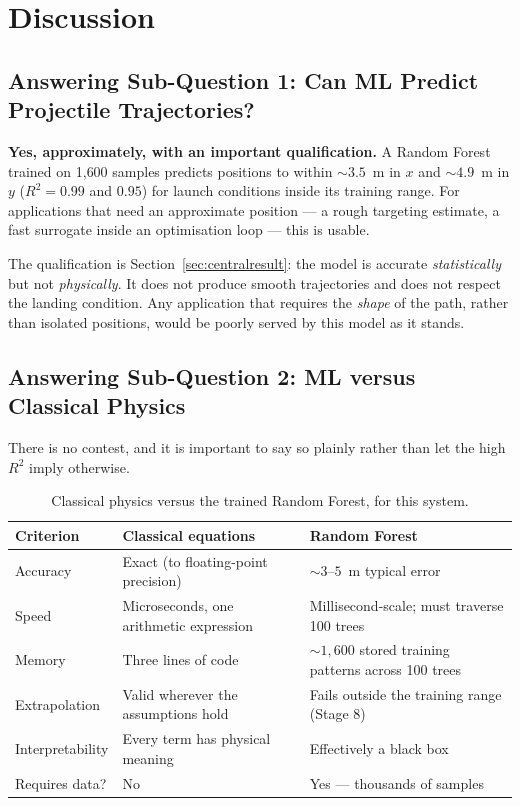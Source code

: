 \documentclass[11pt,a4paper]{article}
\newcommand{\Rsq}{R^{2}}
\begin{document}
\section{Discussion}\label{sec:discussion}

\subsection{Answering Sub-Question 1: Can ML Predict Projectile Trajectories?}

\textbf{Yes, approximately, with an important qualification.} A Random Forest trained on 1{,}600
samples predicts positions to within ${\sim}3.5$~m in $x$ and ${\sim}4.9$~m in $y$ ($\Rsq=0.99$ and
$0.95$) for launch conditions inside its training range. For applications that need an approximate
position --- a rough targeting estimate, a fast surrogate inside an optimisation loop --- this is
usable.

The qualification is Section~\ref{sec:centralresult}: the model is accurate \emph{statistically} but
not \emph{physically}. It does not produce smooth trajectories and does not respect the landing
condition. Any application that requires the \emph{shape} of the path, rather than isolated
positions, would be poorly served by this model as it stands.

\subsection{Answering Sub-Question 2: ML versus Classical Physics}\label{sec:mlvsphysics}

There is no contest, and it is important to say so plainly rather than let the high $\Rsq$ imply
otherwise.

\begin{table}[h]
\centering
\small
\caption{Classical physics versus the trained Random Forest, for this system.}
\begin{tabular}{@{}lp{5.2cm}p{5.2cm}@{}}
\toprule
\textbf{Criterion} & \textbf{Classical equations} & \textbf{Random Forest} \\
\midrule
Accuracy        & Exact (to floating-point precision) & ${\sim}3$--$5$~m typical error \\
Speed           & Microseconds, one arithmetic expression & Millisecond-scale; must traverse 100 trees \\
Memory          & Three lines of code & ${\sim}1{,}600$ stored training patterns across 100 trees \\
Extrapolation   & Valid wherever the assumptions hold & Fails outside the training range (Stage 8) \\
Interpretability& Every term has physical meaning & Effectively a black box \\
Requires data?  & No & Yes --- thousands of samples \\
\bottomrule
\end{tabular}
\end{table}
\end{document}
